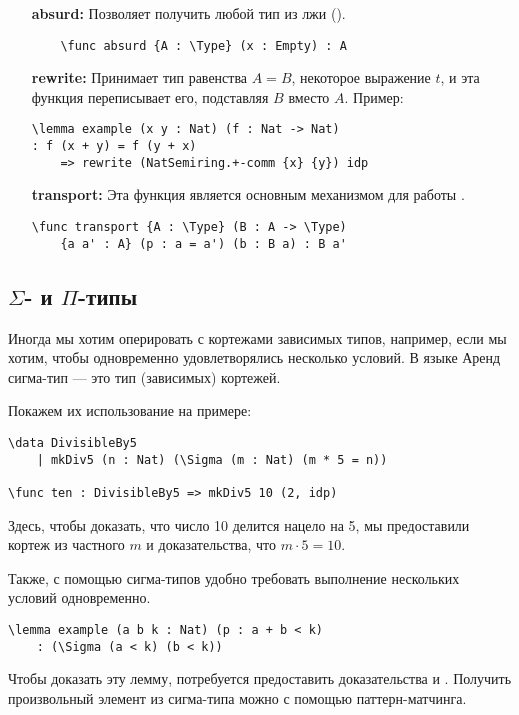 \begin{itemize}
\item [\bf absurd:] Позволяет получить любой тип из лжи ().
\begin{verbatim}
    \func absurd {A : \Type} (x : Empty) : A
\end{verbatim}

\item [\bf rewrite:] Принимает тип равенства $A = B$, некоторое выражение $t$, и эта функция переписывает его, подставляя $B$ вместо $A$.
Пример:
\begin{verbatim}
\lemma example (x y : Nat) (f : Nat -> Nat)
: f (x + y) = f (y + x)
    => rewrite (NatSemiring.+-comm {x} {y}) idp
\end{verbatim}

\item [\bf transport:] Эта функция является основным механизмом для работы .
\begin{verbatim}
\func transport {A : \Type} (B : A -> \Type)
    {a a' : A} (p : a = a') (b : B a) : B a'
\end{verbatim}
\end{itemize}

\subsection{$\Sigma$- и $\Pi$-типы}
Иногда мы хотим оперировать с кортежами зависимых типов, например, если мы хотим,
чтобы одновременно удовлетворялись несколько условий. В языке Аренд сигма-тип --- это тип (зависимых) кортежей.

Покажем их использование на примере:
\begin{verbatim}
\data DivisibleBy5
    | mkDiv5 (n : Nat) (\Sigma (m : Nat) (m * 5 = n))

\func ten : DivisibleBy5 => mkDiv5 10 (2, idp)
\end{verbatim}

Здесь, чтобы доказать, что число 10 делится нацело на 5, мы предоставили кортеж из частного $m$ и доказательства, что $m \cdot 5 = 10$.

Также, с помощью сигма-типов удобно требовать выполнение нескольких условий одновременно.
\begin{verbatim}
\lemma example (a b k : Nat) (p : a + b < k)
    : (\Sigma (a < k) (b < k))
\end{verbatim}

Чтобы доказать эту лемму, потребуется предоставить доказательства  и .
Получить произвольный элемент из сигма-типа можно с помощью паттерн-матчинга.

